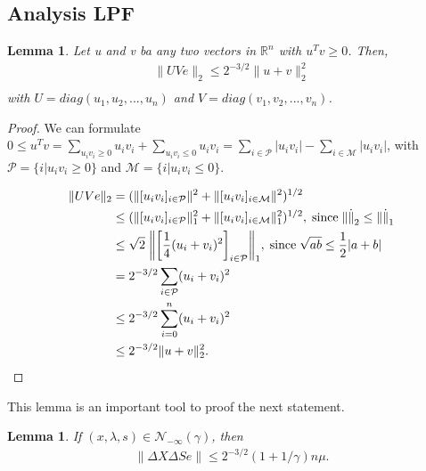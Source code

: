 \documentclass[a4paper,10 pt,titlepage,twoside]{book}
\theoremstyle{plain}
\newtheorem{lem}[thm]{Lemma}
\theoremstyle{definition}
\theoremstyle{remark}
\begin{document}
\subsection{Analysis LPF}

\begin{lem}\label{lem1}
	Let u and v ba any two vectors in $\mathbb{R}^{n}$ with $u^{T}v \geq 0$. Then, 
\begin{align*}
\lVert UVe \rVert_{2}\leq 2^{-3/2}\lVert u + v \rVert^{2}_{2}\\
\end{align*}
with $U = diag(u_{1}, u_{2}, ..., u_{n})$ and $V = diag(v_{1}, v_{2}, ..., v_{n})$. 
\end{lem}
\begin{proof}
	We can formulate $0 \leq u^{T}v = \sum\limits_{u_{i}v_{i} \geq 0}u_{i}v_{i} + \sum\limits_{u_{i}v_{i} \leq 0}u_{i}v_{i} = \sum\limits_{i \in \mathcal{P}}|u_{i}v_{i}| - \sum\limits_{i \in \mathcal{M}}|u_{i}v_{i}| $, with $\mathcal{P}= \{i | u_{i}v_{i} \geq 0\}$ and $\mathcal{M}= \{i | u_{i}v_{i} \leq 0\}$.

\begin{align*}
\lVert UVe \rVert_{2} &= ( \lVert[u_{i}v_{i}]_{i \in \mathcal{P}} \rVert^{2} +  \lVert[u_{i}v_{i}]_{i \in \mathcal{M}} \rVert^{2})^{1/2}\\
&\leq ( \lVert[u_{i}v_{i}]_{i \in \mathcal{P}} \rVert^{2}_{1} +  \lVert[u_{i}v_{i}]_{i \in \mathcal{M}} \rVert^{2}_{1})^{1/2},\; \text{since\;} \lVert\dot\rVert_{2} \leq \lVert\dot\rVert_{1}\\
&\leq\sqrt{2}\;\bigg\lVert\bigg[\frac{1}{4}(u_{i} + v_{i})^{2}\bigg]_{i\in \mathcal{P}}\bigg\rVert_{1}, \text{\;since\;} \sqrt{ab} \leq \frac{1}{2}|a+b|\\
& = 2^{-3/2} \sum\limits_{i \in \mathcal{P}}(u_{i} + v_{i})^{2}\\
& \leq 2^{-3/2} \sum\limits_{i = 0}^{n}(u_{i} + v_{i})^{2}\\
& \leq 2^{-3/2} \lVert u + v \rVert^{2}_{2}.
\end{align*}
\end{proof}	
This lemma is an important tool to proof the next statement.
\begin{lem}
	If $(x, \lambda, s) \in \mathcal{N}_{-\infty}(\gamma)$, then
	\begin{align*}
	\lVert\Delta X\Delta S e \rVert \leq 2^{-3/2}(1 + 1/ \gamma)n\mu.\\
	\end{align*}
\end{lem}
\end{document}
